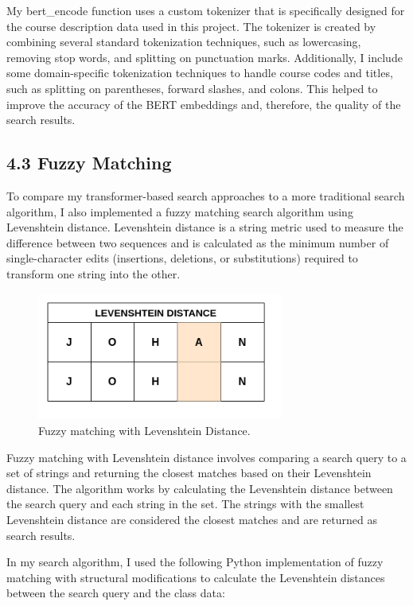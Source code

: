 \documentclass[
	a4paper, %
	10pt, %
	unnumberedsections, %
	twoside, %
]{LTJournalArticle}
\begin{document}
My bert\_encode function uses a custom tokenizer that is specifically designed for the course description data used in this project. The tokenizer is created by combining several standard tokenization techniques, such as lowercasing, removing stop words, and splitting on punctuation marks. Additionally, I include some domain-specific tokenization techniques to handle course codes and titles, such as splitting on parentheses, forward slashes, and colons. This helped to improve the accuracy of the BERT embeddings and, therefore, the quality of the search results.


\subsection{4.3 Fuzzy Matching}

To compare my transformer-based search approaches to a more traditional search algorithm, I also implemented a fuzzy matching search algorithm using Levenshtein distance. Levenshtein distance is a string metric used to measure the difference between two sequences and is calculated as the minimum number of single-character edits (insertions, deletions, or substitutions) required to transform one string into the other. 

\begin{figure}[h]
    \includegraphics[width=8.1cm]{fuzzy.png}
    \caption{Fuzzy matching with Levenshtein Distance.}
    \label{fig:fuzzy}
\end{figure}

Fuzzy matching with Levenshtein distance involves comparing a search query to a set of strings and returning the closest matches based on their Levenshtein distance. The algorithm works by calculating the Levenshtein distance between the search query and each string in the set. The strings with the smallest Levenshtein distance are considered the closest matches and are returned as search results.

In my search algorithm, I used the following Python implementation of fuzzy matching with structural modifications to calculate the Levenshtein distances between the search query and the class data:
\end{document}
